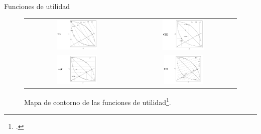 \documentclass{beamer}
\begin{document}
\begin{frame}{Funciones de utilidad}
\begin{figure}[H]
\begin{tabular}{c c}
\includegraphics[width=0.4\textwidth]{ws.png}     &  \includegraphics[width=0.42\textwidth]{che.png} \\
\includegraphics[width=0.4\textwidth]{asf.png}     &  \includegraphics[width=0.4\textwidth]{pbi.png} \\
\end{tabular}
\centering
\caption{\scriptsize Mapa de contorno de las funciones de utilidad\footcite{raquel_2018}.}
\end{figure}
\end{frame}
\end{document}

